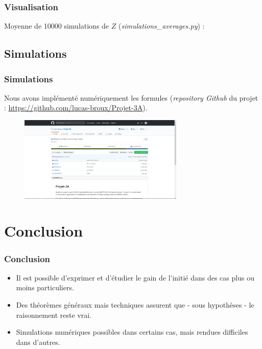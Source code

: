 \documentclass{beamer}
\begin{document}
\begin{frame}
\frametitle{Visualisation}
\par Moyenne de 10000 simulations de $Z$ (\emph{simulations\_averages.py}) : 

\end{frame}


\subsection{Simulations}

\begin{frame}
\frametitle{Simulations}
\par Nous avons implémenté numériquement les formules (\emph{repository Github} du projet : \url{https://github.com/lucas-broux/Projet-3A}).
\begin{figure}[H]
  \centering
    \includegraphics[width=0.7\textwidth]{images/github.png}
  \caption{}
\end{figure}

\end{frame}



\section{Conclusion}

\begin{frame}
\frametitle{Conclusion}
\begin{itemize}
\item Il est possible d'exprimer et d'étudier le gain de l'initié dans des cas plus ou moins particuliers.
\item Des théorèmes généraux mais techniques assurent que - sous hypothèses - le raisonnement reste vrai.
\item Simulations numériques possibles dans certains cas, mais rendues difficiles dans d'autres.
\end{itemize}
\end{frame}
\end{document}
